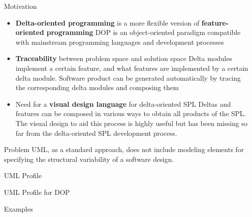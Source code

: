 \begin{frame}{Motivation}
	\begin{fancycolumns}
	\begin{note}{}
		\begin{itemize}
			\item \textbf{Delta-oriented programming} is a more flexible version of \textbf{feature-oriented programming}
			\newline DOP is an object-oriented paradigm compatible with mainstream programming languages and development processes
			\item \textbf{Traceability} between problem space and solution space 
			\newline Delta modules implement a certain feature, and what features are implemented by a certain 
				delta module. Software product can be generated automatically
				by tracing the corresponding delta modules and composing them
			\item Need for a \textbf{visual design language} for delta-oriented SPL 
			\newline Deltas and features can be composed in various ways to obtain all products of the SPL.
			The visual design to aid this process is highly useful but has been missing so far from the delta-oriented SPL development process.
		\end{itemize}
	\end{note}
	\pause
	\begin{note}{Problem}
		 UML, as a standard approach, does not include modeling elements for specifying the structural variability of a software design.
	\end{note}

	\end{fancycolumns}
\end{frame}




\begin{frame}{UML Profile}
	\begin{fancycolumns}[widths={30},animation=none]
	
	\end{fancycolumns}

\end{frame}



\begin{frame}{UML Profile for DOP}
	\begin{fancycolumns}[widths={30},animation=none]
		
	\end{fancycolumns}
\end{frame}




\begin{frame}{Examples}
	\begin{fancycolumns}[widths={30},animation=none]
		
	\end{fancycolumns}
\end{frame}


